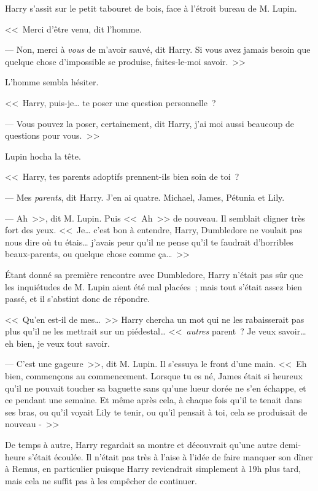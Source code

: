 Harry s'assit sur le petit tabouret de bois, face à l'étroit bureau de M. Lupin.

<<~Merci d'être venu, dit l'homme.

--- Non, merci à \emph{vous} de m'avoir sauvé, dit Harry. Si vous avez jamais besoin que quelque chose d'impossible se produise, faites-le-moi savoir.~>>

L'homme sembla hésiter.

<<~Harry, puis-je… te poser une question personnelle~?

--- Vous pouvez la poser, certainement, dit Harry, j'ai moi aussi beaucoup de questions pour vous.~>>

Lupin hocha la tête.

<<~Harry, tes parents adoptifs prennent-ils bien soin de toi~?

--- Mes \emph{parents}, dit Harry. J'en ai quatre. Michael, James, Pétunia et Lily.

--- Ah~>>, dit M. Lupin. Puis <<~Ah~>> de nouveau. Il semblait cligner très fort des yeux. <<~Je… c'est bon à entendre, Harry, Dumbledore ne voulait pas nous dire où tu étais… j'avais peur qu'il ne pense qu'il te faudrait d'horribles beaux-parents, ou quelque chose comme ça…~>>

Étant donné sa première rencontre avec Dumbledore, Harry n'était pas sûr que les inquiétudes de M. Lupin aient été mal placées~; mais tout s'était assez bien passé, et il s'abstint donc de répondre.

<<~Qu'en est-il de mes…~>> Harry chercha un mot qui ne les rabaisserait pas plus qu'il ne les mettrait sur un piédestal… <<~\emph{autres} parent~? Je veux savoir… eh bien, je veux tout savoir.

--- C'est une gageure~>>, dit M. Lupin. Il s'essuya le front d'une main. <<~Eh bien, commençons au commencement. Lorsque tu es né, James était si heureux qu'il ne pouvait toucher sa baguette sans qu'une lueur dorée ne s'en échappe, et ce pendant une semaine. Et même après cela, à chaque fois qu'il te tenait dans ses bras, ou qu'il voyait Lily te tenir, ou qu'il pensait à toi, cela se produisait de nouveau -~>>

\later

De temps à autre, Harry regardait sa montre et découvrait qu'une autre demi-heure s'était écoulée. Il n'était pas très à l'aise à l'idée de faire manquer son dîner à Remus, en particulier puisque Harry reviendrait simplement à 19h plus tard, mais cela ne suffit pas à les empêcher de continuer.

